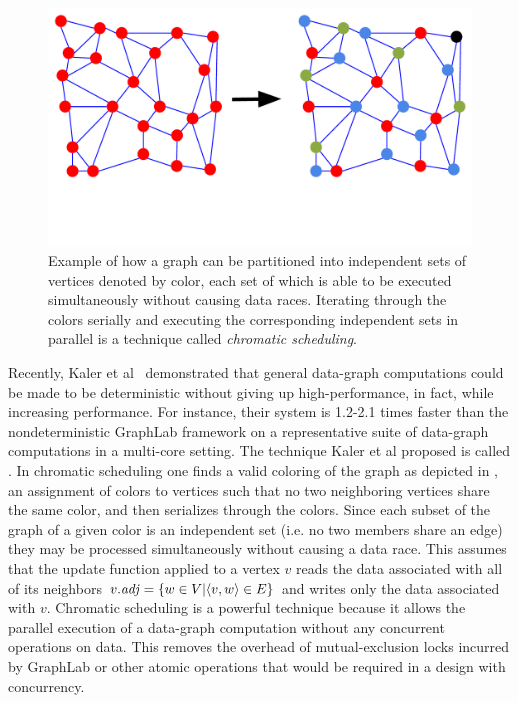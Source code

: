 \begin{figure}[!h]
\centering
\includegraphics[width=5in,clip,trim=0 3cm 0 0]{chromatic_scheduling.pdf}
\caption{Example of how a graph can be partitioned into 
independent sets of vertices denoted by color, each set of which is able to
be executed simultaneously without causing data races.  Iterating
through the colors serially and executing the corresponding
independent sets in parallel is a technique called \emph{chromatic scheduling}.}
\label{fig:chromatic_scheduling}
\end{figure}

Recently, Kaler et al~\cite{KalerHaSc14} demonstrated that general
data-graph computations could be made to be deterministic without
giving up high-performance, in fact, while increasing performance.
For instance, their system  is 1.2-2.1 times faster than
the nondeterministic GraphLab framework on a representative suite of data-graph
computations in a multi-core setting.  The technique Kaler et al proposed
is called .  In chromatic scheduling one
finds a valid coloring of the graph as depicted in 
, an assignment of colors to 
vertices such that no two neighboring vertices share the same color,
and then serializes through the colors.  Since each subset of the graph
of a given color is an independent set (i.e. no two members share an
edge) they may be processed simultaneously without causing a data race.
This assumes that the update function applied to a vertex $v$ reads
the data associated with all of its neighbors 
$\attrib{v}{\id{adj}} = \set{w \in V | \langle v, w \rangle \in E}$ 
and writes only the data
associated with $v$.  Chromatic scheduling is a powerful technique
because it allows the parallel execution of a data-graph computation
without any concurrent operations on data.  This removes the overhead
of mutual-exclusion locks incurred by GraphLab or other atomic operations
that would be required in a design with concurrency.

